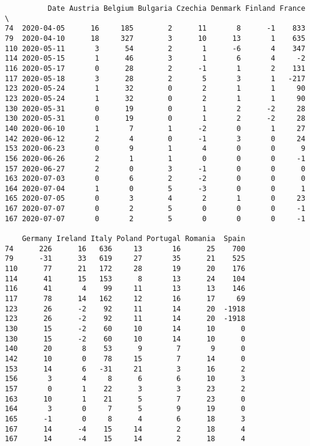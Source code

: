 \documentclass[11pt]{article}
\begin{document}
    
    \begin{verbatim}
          Date Austria Belgium Bulgaria Czechia Denmark Finland France  \
74  2020-04-05      16     185        2      11       8      -1    833   
79  2020-04-10      18     327        3      10      13       1    635   
110 2020-05-11       3      54        2       1      -6       4    347   
114 2020-05-15       1      46        3       1       6       4     -2   
116 2020-05-17       0      28        2      -1       1       2    131   
117 2020-05-18       3      28        2       5       3       1   -217   
123 2020-05-24       1      32        0       2       1       1     90   
123 2020-05-24       1      32        0       2       1       1     90   
130 2020-05-31       0      19        0       1       2      -2     28   
130 2020-05-31       0      19        0       1       2      -2     28   
140 2020-06-10       1       7        1      -2       0       1     27   
142 2020-06-12       2       4        0      -1       3       0     24   
153 2020-06-23       0       9        1       4       0       0      9   
156 2020-06-26       2       1        1       0       0       0     -1   
157 2020-06-27       2       0        3      -1       0       0      0   
163 2020-07-03       0       6        2      -2       0       0      0   
164 2020-07-04       1       0        5      -3       0       0      1   
165 2020-07-05       0       3        4       2       1       0     23   
167 2020-07-07       0       2        5       0       0       0     -1   
167 2020-07-07       0       2        5       0       0       0     -1   

    Germany Ireland Italy Poland Portugal Romania  Spain  
74      226      16   636     13       16      25    700  
79      -31      33   619     27       35      21    525  
110      77      21   172     28       19      20    176  
114      41      15   153      8       13      24    104  
116      41       4    99     11       13      13    146  
117      78      14   162     12       16      17     69  
123      26      -2    92     11       14      20  -1918  
123      26      -2    92     11       14      20  -1918  
130      15      -2    60     10       14      10      0  
130      15      -2    60     10       14      10      0  
140      20       8    53      9        7       9      0  
142      10       0    78     15        7      14      0  
153      14       6   -31     21        3      16      2  
156       3       4     8      6        6      10      3  
157       0       1    22      3        3      23      2  
163      10       1    21      5        7      23      0  
164       3       0     7      5        9      19      0  
165      -1       0     8      4        6      18      3  
167      14      -4    15     14        2      18      4  
167      14      -4    15     14        2      18      4  
    \end{verbatim}
\end{document}
